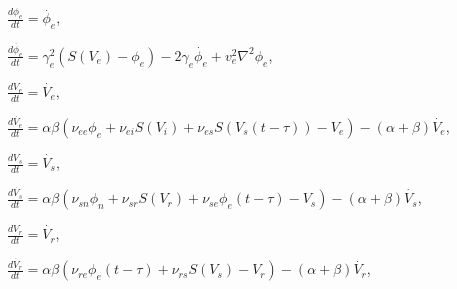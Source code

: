 \documentclass[12pt]{article}
\begin{document}
\vspace{0.5cm}

   $\displaystyle \frac{d \phi_e}{dt} = \dot{\phi_e} $, \\
   
\vspace{0.5cm}
  
   $\displaystyle \frac{d \dot{\phi_e}}{dt} =   \gamma_e^2 (S(V_e) - \phi_e) - 2 \gamma_e \dot{\phi_e}  + v_e^2 \nabla^2 \phi_e $, \\

\vspace{0.5cm}

   $\displaystyle \frac{d V_e}{dt}= \dot{V_e} $, \\

\vspace{0.5cm}

   $\displaystyle \frac{d \dot{V_e}}{dt} =  \alpha \beta (\nu_{ee}\phi_e + \nu_{ei} S(V_i) + \nu_{es} S(V_s(t-\tau)) - V_e) - ( \alpha + \beta) \dot{V_e}$, \\

\vspace{0.5cm}

   $\displaystyle \frac{d V_s}{dt}= \dot{V_s}$, \\

\vspace{0.5cm}

   $\displaystyle \frac{d \dot{V_s}}{dt} =  \alpha \beta (\nu_{sn}\phi_n + \nu_{sr} S(V_r) + \nu_{se}\phi_e(t-\tau) - V_s)-( \alpha + \beta) \dot{V_s}$, \\

\vspace{0.5cm}

   $\displaystyle \frac{d V_r}{dt} = \dot{V_r}$, \\

\vspace{0.5cm}

   $\displaystyle \frac{d \dot{V_r}}{dt} =  \alpha \beta (\nu_{re}\phi_e(t-\tau) + \nu_{rs} S(V_s) - V_r)-( \alpha + \beta) \dot{V_r}$, \\

%

 


  
\end{document}
